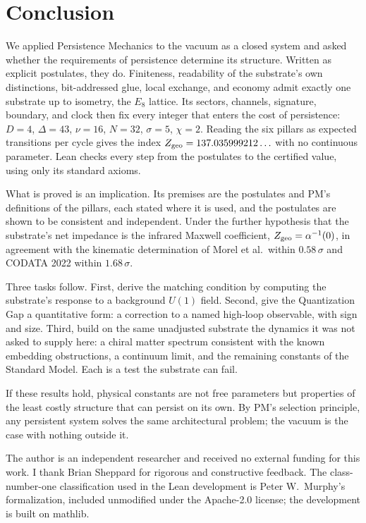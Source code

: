 \section{Conclusion}
\label{sec:conclusion}
We applied Persistence Mechanics to the vacuum as a closed system and asked whether the requirements of persistence determine its structure. Written as explicit postulates, they do. Finiteness, readability of the substrate's own distinctions, bit-addressed glue, local exchange, and economy admit exactly one substrate up to isometry, the $E_8$ lattice. Its sectors, channels, signature, boundary, and clock then fix every integer that enters the cost of persistence: $D=4$, $\Delta=43$, $\nu=16$, $N=32$, $\sigma=5$, $\chi=2$. Reading the six pillars as expected transitions per cycle gives the index $Z_{\rm geo}=137.035999212\ldots$ with no continuous parameter. Lean checks every step from the postulates to the certified value, using only its standard axioms.

What is proved is an implication. Its premises are the postulates and PM's definitions of the pillars, each stated where it is used, and the postulates are shown to be consistent and independent. Under the further hypothesis that the substrate's net impedance is the infrared Maxwell coefficient, $Z_{\rm geo}=\alpha^{-1}(0)$, in agreement with the kinematic determination of Morel et al.\ within $0.58\,\sigma$ and CODATA 2022 within $1.68\,\sigma$.

Three tasks follow. First, derive the matching condition by computing the substrate's response to a background $U(1)$ field. Second, give the Quantization Gap a quantitative form: a correction to a named high-loop observable, with sign and size. Third, build on the same unadjusted substrate the dynamics it was not asked to supply here: a chiral matter spectrum consistent with the known embedding obstructions, a continuum limit, and the remaining constants of the Standard Model. Each is a test the substrate can fail.

If these results hold, physical constants are not free parameters but properties of the least costly structure that can persist on its own. By PM's selection principle, any persistent system solves the same architectural problem; the vacuum is the case with nothing outside it.

\begin{acknowledgments}
The author is an independent researcher and received no external funding for this work. I thank Brian Sheppard for rigorous and constructive feedback. The class-number-one classification used in the Lean development is Peter W.~Murphy's formalization, included unmodified under the Apache-2.0 license; the development is built on mathlib.
\end{acknowledgments}
